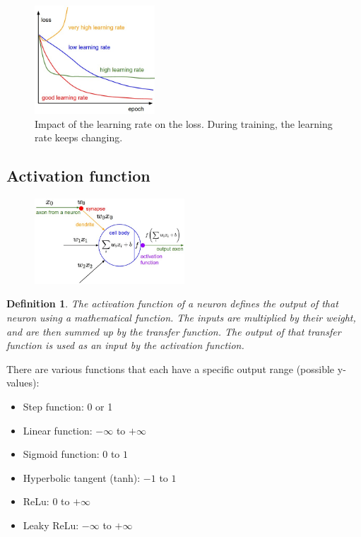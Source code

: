 \documentclass{article}
\newtheorem{theorem}{Definition}[section]
\begin{document}
\begin{figure}[H]
    \centering
    \includegraphics[width=0.4\textwidth]{backpropagation-learning-rate.png}
    \caption{Impact of the learning rate on the loss. During training, the learning rate keeps changing.}
\end{figure}

\subsection{Activation function}

\begin{figure}[H]
    \centering
    \includegraphics[width=0.5\textwidth]{activation-function.png}
\end{figure}


\begin{theorem}
    The activation function of a neuron defines the output of that neuron using a mathematical function.
    The inputs are multiplied by their weight, and are then summed up by the transfer function.
    The output of that transfer function is used as an input by the activation function.
\end{theorem}

There are various functions that each have a specific output range (possible y-values):


\begin{itemize}
    \item Step function: 0 or 1
    \item Linear function: $-\infty$ to $+\infty$
    \item Sigmoid function: $0$ to $1$
    \item Hyperbolic tangent (tanh): $-1$ to $1$
    \item ReLu: $0$ to $+\infty$
    \item Leaky ReLu: $-\infty$ to $+\infty$
\end{itemize}
\end{document}
